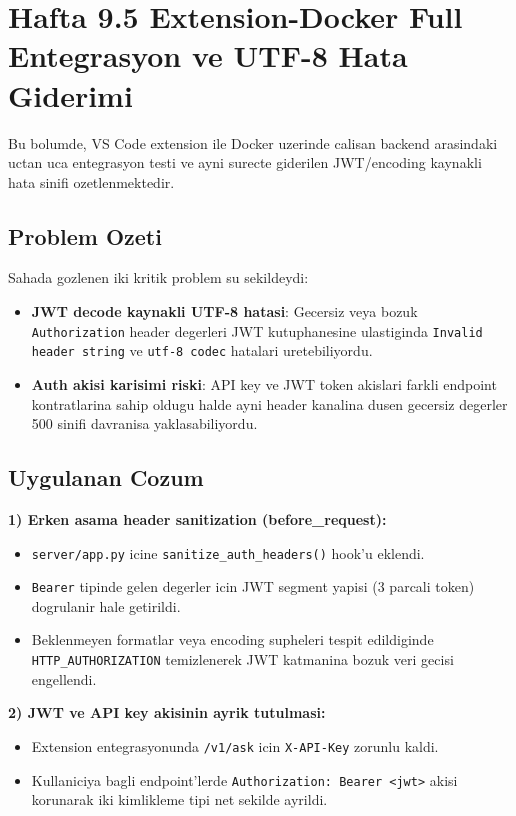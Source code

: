 \documentclass[11pt,a4paper]{article}
\begin{document}
{\section{Hafta 9.5 Extension-Docker Full Entegrasyon ve UTF-8 Hata Giderimi}

Bu bolumde, VS Code extension ile Docker uzerinde calisan backend arasindaki uctan uca entegrasyon testi ve ayni surecte giderilen JWT/encoding kaynakli hata sinifi ozetlenmektedir.

\subsection{Problem Ozeti}

Sahada gozlenen iki kritik problem su sekildeydi:
\begin{itemize}[leftmargin=1.5em]
	\item \textbf{JWT decode kaynakli UTF-8 hatasi}: Gecersiz veya bozuk \texttt{Authorization} header degerleri JWT kutuphanesine ulastiginda \texttt{Invalid header string} ve \texttt{utf-8 codec} hatalari uretebiliyordu.
	\item \textbf{Auth akisi karisimi riski}: API key ve JWT token akislari farkli endpoint kontratlarina sahip oldugu halde ayni header kanalina dusen gecersiz degerler 500 sinifi davranisa yaklasabiliyordu.
\end{itemize}

\subsection{Uygulanan Cozum}

\textbf{1) Erken asama header sanitization (before\_request):}
\begin{itemize}[leftmargin=1.5em]
	\item \texttt{server/app.py} icine \texttt{sanitize\_auth\_headers()} hook'u eklendi.
	\item \texttt{Bearer} tipinde gelen degerler icin JWT segment yapisi (3 parcali token) dogrulanir hale getirildi.
	\item Beklenmeyen formatlar veya encoding supheleri tespit edildiginde \texttt{HTTP\_AUTHORIZATION} temizlenerek JWT katmanina bozuk veri gecisi engellendi.
\end{itemize}

\textbf{2) JWT ve API key akisinin ayrik tutulmasi:}
\begin{itemize}[leftmargin=1.5em]
	\item Extension entegrasyonunda \texttt{/v1/ask} icin \texttt{X-API-Key} zorunlu kaldi.
	\item Kullaniciya bagli endpoint'lerde \texttt{Authorization: Bearer <jwt>} akisi korunarak iki kimlikleme tipi net sekilde ayrildi.
\end{itemize}

}
\end{document}
